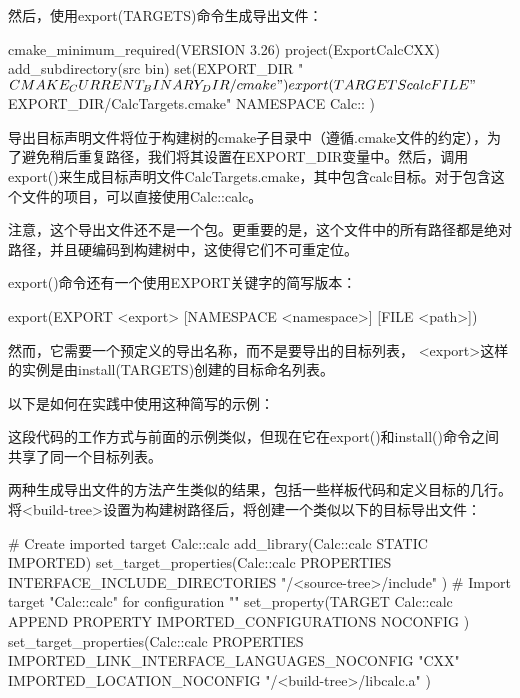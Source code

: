 然后，使用export(TARGETS)命令生成导出文件：


\begin{cmake}
cmake_minimum_required(VERSION 3.26)
project(ExportCalcCXX)
add_subdirectory(src bin)
set(EXPORT_DIR "${CMAKE_CURRENT_BINARY_DIR}/cmake")
export(TARGETS calc
    FILE "${EXPORT_DIR}/CalcTargets.cmake"
    NAMESPACE Calc::
)
\end{cmake}

导出目标声明文件将位于构建树的cmake子目录中（遵循.cmake文件的约定），为了避免稍后重复路径，我们将其设置在EXPORT\_DIR变量中。然后，调用export()来生成目标声明文件CalcTargets.cmake，其中包含calc目标。对于包含这个文件的项目，可以直接使用Calc::calc。

注意，这个导出文件还不是一个包。更重要的是，这个文件中的所有路径都是绝对路径，并且硬编码到构建树中，这使得它们不可重定位。

export()命令还有一个使用EXPORT关键字的简写版本：

\begin{shell}
export(EXPORT <export> [NAMESPACE <namespace>] [FILE <path>])
\end{shell}

然而，它需要一个预定义的导出名称，而不是要导出的目标列表， <export>这样的实例是由install(TARGETS)创建的目标命名列表。

以下是如何在实践中使用这种简写的示例：



这段代码的工作方式与前面的示例类似，但现在它在export()和install()命令之间共享了同一个目标列表。

两种生成导出文件的方法产生类似的结果，包括一些样板代码和定义目标的几行。将<build-tree>设置为构建树路径后，将创建一个类似以下的目标导出文件：


\begin{cmake}
# Create imported target Calc::calc
add_library(Calc::calc STATIC IMPORTED)
set_target_properties(Calc::calc PROPERTIES
    INTERFACE_INCLUDE_DIRECTORIES
    "/<source-tree>/include"
)
# Import target "Calc::calc" for configuration ""
set_property(TARGET Calc::calc APPEND PROPERTY
    IMPORTED_CONFIGURATIONS NOCONFIG
)
set_target_properties(Calc::calc PROPERTIES
    IMPORTED_LINK_INTERFACE_LANGUAGES_NOCONFIG "CXX"
    IMPORTED_LOCATION_NOCONFIG "/<build-tree>/libcalc.a"
)
\end{cmake}

